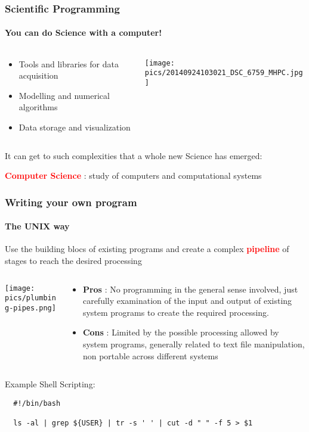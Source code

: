 \documentclass[unknownkeysallowed, 10pt, a4 paper, handout]{beamer}
\newcommand{\focus}[1]{\textbf{\textcolor{red}{#1}}}
\begin{document}
\begin{frame}[label=science]
  \frametitle{Scientific Programming}
  \framesubtitle{You can do Science with a computer!}
  \begin{columns}[T]
    \begin{column}{.53\textwidth}
      \begin{block}{}
        \begin{itemize}
          \item Tools and libraries for data acquisition
          \item Modelling and numerical algorithms
          \item Data storage and visualization
        \end{itemize}
      \end{block}
    \end{column}
    \hfill
    \begin{column}{.45\textwidth}
      \vspace{15pt}
      \texttt{[image: pics/20140924103021\_DSC\_6759\_MHPC.jpg]}
    \end{column}
  \end{columns}
  It can get to such complexities that a whole new Science has emerged:
  \begin{center}
    \focus{Computer Science} :
             study of computers and computational systems
  \end{center}
\end{frame}


\begin{frame}[label=pipelining, fragile=singleslide]
  \frametitle{Writing your own program}
  \framesubtitle{The UNIX way}
  Use the building blocs of existing programs and create a complex
  \focus{pipeline} of stages to reach the desired processing
  \begin{columns}[T]
    \begin{column}{.33\textwidth}
      \vspace{20pt}
      \texttt{[image: pics/plumbing-pipes.png]}
    \end{column}
    \hfill
    \begin{column}{.66\textwidth}
      \begin{itemize}
        \item \textbf{Pros} : No programming in the general sense involved,
          just carefully examination of the input and output of existing
          system programs to create the required processing.
        \item \textbf{Cons} : Limited by the possible processing allowed by
          system programs, generally related to text file manipulation,
          non portable across different systems
      \end{itemize}
    \end{column}
  \end{columns}
  Example Shell Scripting:
  \begin{verbatim}
  #!/bin/bash

  ls -al | grep ${USER} | tr -s ' ' | cut -d " " -f 5 > $1
  \end{verbatim}
\end{frame}
\end{document}
